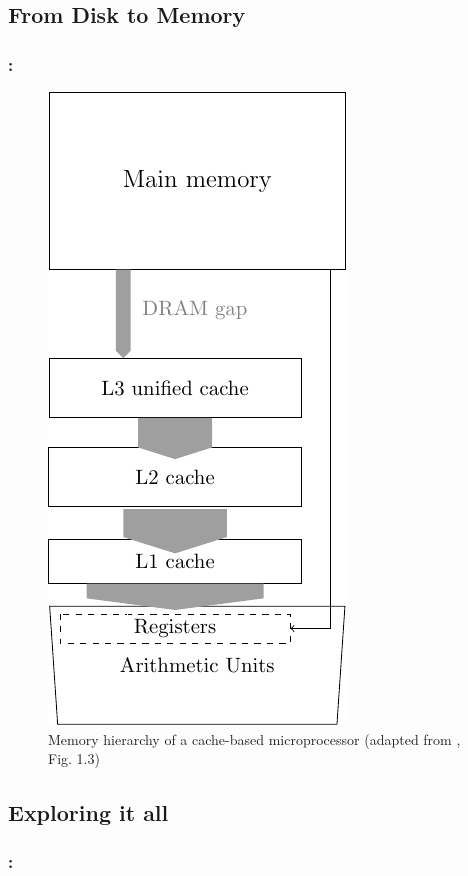 \documentclass[9pt,xcolor=table]{beamer}
\begin{document}
\subsection{From Disk to Memory}
\begin{frame}
\frametitle{\insertsectionhead{}: \insertsubsection{}}
\begin{figure}[htb]
\includegraphics[height=0.65\textheight]{tikz/dram_gap}\\[12pt]\Large
Memory hierarchy of a cache-based microprocessor (adapted from \cite{HagerWelleinIntroHPC}, Fig. 1.3)
\end{figure}

\end{frame}

\subsection{Exploring it all}
\begin{frame}
\frametitle{\insertsectionhead{}: \insertsubsection{}}
\end{frame}
\end{document}
